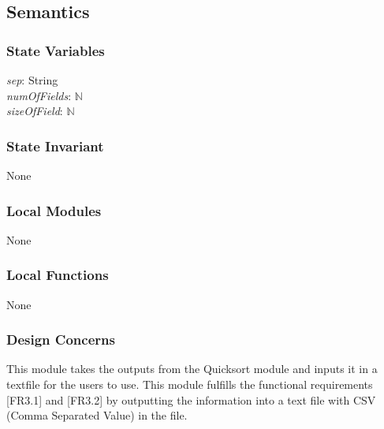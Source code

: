\documentclass[12pt]{article}
\begin{document}
                \subsection* {Semantics}
                
                \subsubsection *{State Variables} 
                
                    \textit{sep}: String\\
                    \textit{numOfFields}: $\mathbb{N}$\\
                    \textit{sizeOfField}: $\mathbb{N}$\\
                    
                \subsubsection *{State Invariant}
                
                None
                
                \subsubsection*{Local Modules}
                
                None
                
                \subsubsection*{Local Functions}
                
                None
                
                \subsubsection* {Design Concerns}

                This module takes the outputs from the Quicksort module and inputs it in a textfile for the users to use.
                This module fulfills the functional requirements [FR3.1] and [FR3.2] by outputting the information into a text file with CSV (Comma Separated Value) in the file.
                \newpage
\end{document}
